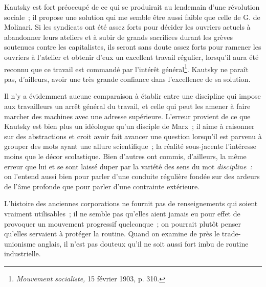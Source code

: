 \documentclass[french,twoside]{book} %
\begin{document}
\noindent Kautsky est fort préoccupé de ce qui se produirait au lendemain d’une révolution sociale ; il propose une solution qui me semble être aussi faible que celle de G. de Molinari. Si les syndicats ont été assez forts pour décider les ouvriers actuels à abandonner leurs ateliers et à subir de grands sacrifices durant les grèves soutenues contre les capitalistes, ils seront sans doute assez forts pour ramener les ouvriers à l’atelier et obtenir d’eux un excellent travail régulier, lorsqu’il aura été reconnu que ce travail est commandé par l’intérêt général\footnote{ \noindent \emph{Mouvement socialiste,} 15 février 1903, p. 310.
 }. Kautsky ne paraît pas, d’ailleurs, avoir une très grande confiance dans l’excellence de sa solution.\par
Il n’y a évidemment aucune comparaison à établir entre une discipline qui impose aux travailleurs un arrêt général du travail, et celle qui peut les amener à faire marcher des machines avec une adresse supérieure. L’erreur provient de ce que Kautsky est bien plus un idéologue qu’un disciple de Marx ; il aime à raisonner sur des abstractions et croit avoir fait avancer une question lorsqu’il est parvenu à grouper des mots ayant une allure scientifique ; la réalité sous-jacente l’intéresse moins que le décor scolastique. Bien d’autres ont commis, d’ailleurs, la même erreur que lui et se sont laissé duper par la variété des sens du mot \emph{discipline :} on l’entend aussi bien pour parler d’une conduite régulière  fondée sur des ardeurs de l’âme profonde que pour parler d’une contrainte extérieure.\par
L’histoire des anciennes corporations ne fournit pas de renseignements qui soient vraiment utilisables ; il ne semble pas qu’elles aient jamais eu pour effet de provoquer un mouvement progressif quelconque ; on pourrait plutôt penser qu’elles servaient à protéger la routine. Quand on examine de près le trade-unionisme anglais, il n’est pas douteux qu’il ne soit aussi fort imbu de routine industrielle.\par
\end{document}
